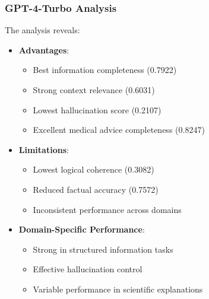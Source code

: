\subsubsection{GPT-4-Turbo Analysis}
The analysis reveals:
\begin{itemize}
    \item \textbf{Advantages}:
    \begin{itemize}
        \item Best information completeness (0.7922)
        \item Strong context relevance (0.6031)
        \item Lowest hallucination score (0.2107)
        \item Excellent medical advice completeness (0.8247)
    \end{itemize}
    \item \textbf{Limitations}:
    \begin{itemize}
        \item Lowest logical coherence (0.3082)
        \item Reduced factual accuracy (0.7572)
        \item Inconsistent performance across domains
    \end{itemize}
    \item \textbf{Domain-Specific Performance}:
    \begin{itemize}
        \item Strong in structured information tasks
        \item Effective hallucination control
        \item Variable performance in scientific explanations
    \end{itemize}
\end{itemize}

